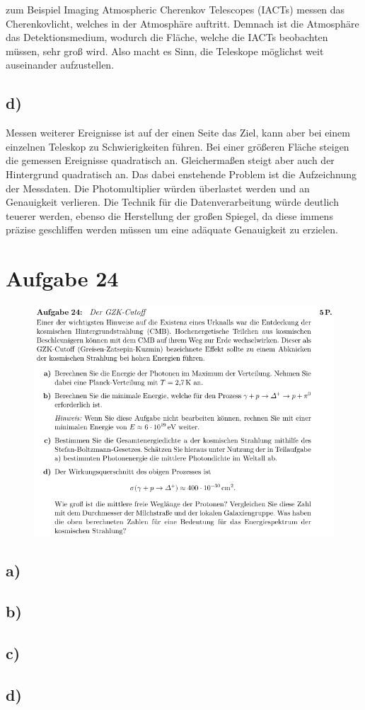     \justifying zum Beispiel Imaging Atmospheric Cherenkov Telescopes (IACTs) messen das Cherenkovlicht, welches in der 
    Atmosphäre auftritt. Demnach ist die Atmosphäre das Detektionsmedium, wodurch die Fläche, welche die IACTs beobachten müssen, sehr groß
    wird. Also macht es Sinn, die Teleskope möglichst weit auseinander aufzustellen.  

\subsection{d)}

    \justifying Messen weiterer Ereignisse ist auf der einen Seite das Ziel, kann aber bei einem einzelnen Teleskop zu Schwierigkeiten
    führen. Bei einer größeren Fläche steigen die gemessen Ereignisse quadratisch an. Gleichermaßen steigt aber auch der Hintergrund quadratisch an. 
    Das dabei enstehende Problem ist die Aufzeichnung der Messdaten. Die Photomultiplier würden überlastet werden und an Genauigkeit verlieren. Die
    Technik für die Datenverarbeitung würde deutlich teuerer werden, ebenso die Herstellung der großen Spiegel, da diese immens präzise geschliffen werden 
    müssen um eine adäquate Genauigkeit zu erzielen. 

\section{Aufgabe 24}

    \begin{figure}[H]
        \centering
        \includegraphics[width=\textwidth]{images/Aufgabe24.jpg}
        \label{fig:5}
    \end{figure}

\subsection{a)}

\subsection{b)}

\subsection{c)}

\subsection{d)}

